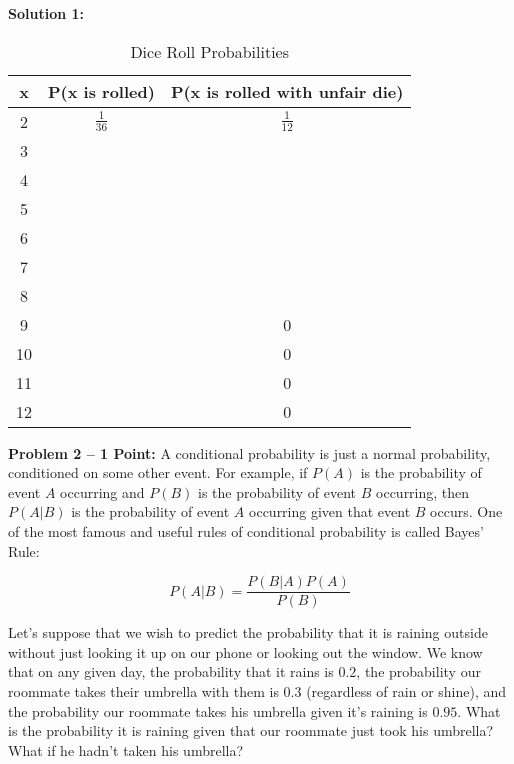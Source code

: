 \documentclass[]{article}
\begin{document}
\textbf{Solution 1:}
\bigskip
\begin{table}[htb]
\centering
    \begin{tabular}{|c|c|c|}
      \hline
      x & P(x is rolled) & P(x is rolled with unfair die) \\ \hline
      2 & $\frac{1}{36}$ & $\frac{1}{12}$ \\
      3 & & \\
      4 & & \\
      5 & & \\
      6 & & \\
      7 & & \\
      8 & & \\
      9 & & 0 \\
      10 & & 0 \\
      11 & & 0 \\
      12 & & 0 \\
      \hline
    \end{tabular}
    \caption{Dice Roll Probabilities}
    \label{tab:dice}
\end{table}

\clearpage
\textbf{Problem 2 -- 1 Point:}
A conditional probability is just a normal probability, conditioned on some other event.  For example, if $P(A)$ is the probability of event $A$ occurring and $P(B)$ is the probability of event $B$ occurring, then $P(A|B)$ is the probability of event $A$ occurring given that event $B$ occurs.  One of the most famous and useful rules of conditional probability is called Bayes' Rule:

$$P(A|B) = \frac{P(B|A)P(A)}{P(B)}$$

Let's suppose that we wish to predict the probability that it is raining outside without just looking it up on our phone or looking out the window.  We know that on any given day, the probability that it rains is $0.2$, the probability our roommate takes their umbrella with them is $0.3$ (regardless of rain or shine), and the probability our roommate takes his umbrella given it's raining is $0.95$.  What is the probability it is raining given that our roommate just took his umbrella?  What if he hadn't taken his umbrella?
\end{document}
